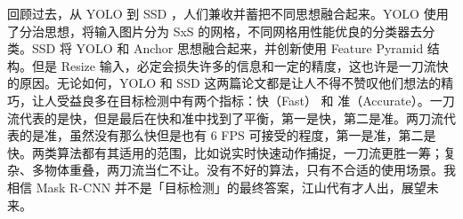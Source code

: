 回顾过去，从 YOLO 到 SSD ，人们兼收并蓄把不同思想融合起来。YOLO 使用了分治思想，将输入图片分为 SxS 的网格，不同网格用性能优良的分类器去分类。SSD 将 YOLO 和 Anchor 思想融合起来，并创新使用 Feature Pyramid 结构。但是 Resize 输入，必定会损失许多的信息和一定的精度，这也许是一刀流快的原因。无论如何，YOLO 和 SSD 这两篇论文都是让人不得不赞叹他们想法的精巧，让人受益良多在目标检测中有两个指标：快（Fast） 和 准（Accurate）。一刀流代表的是快，但是最后在快和准中找到了平衡，第一是快，第二是准。两刀流代表的是准，虽然没有那么快但是也有 6 FPS 可接受的程度，第一是准，第二是快。两类算法都有其适用的范围，比如说实时快速动作捕捉，一刀流更胜一筹；复杂、多物体重叠，两刀流当仁不让。没有不好的算法，只有不合适的使用场景。我相信 Mask R-CNN 并不是「目标检测」的最终答案，江山代有才人出，展望未来。
